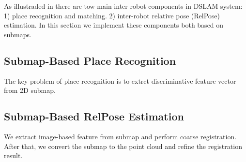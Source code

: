 \label{sec:dslam}
As illustraded in  there are tow main inter-robot components in DSLAM system: 1) place recognition and matching. 2) inter-robot relative pose (RelPose) estimation. In this section we implement these components both based on submaps.

\subsection{Submap-Based Place Recognition}
The key problem of place recognition is to extrct discriminative feature vector from 2D submap.

\subsection{Submap-Based RelPose Estimation}

We extract image-based feature from submap and perform coarse registration. After that, we convert the submap to the point cloud and refine the registration result.
